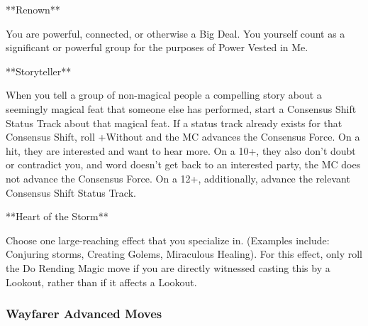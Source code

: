 \documentclass[
  oneside,
  statementpaper,
  9pt]{memoir}
\begin{document}
\begin{Player}

**Renown**

You are powerful, connected, or otherwise a Big Deal. You yourself count as a significant or powerful group for the purposes of Power Vested in Me.

**Storyteller**

When you tell a group of non-magical people a compelling story about a seemingly magical feat that someone else has performed, start a Consensus Shift Status Track about that magical feat. If a status track already exists for that Consensus Shift, roll +Without and the MC advances the Consensus Force. On a hit, they are interested and want to hear more. On a 10+, they also don’t doubt or contradict you, and word doesn’t get back to an interested party, the MC does not advance the Consensus Force. On a 12+, additionally, advance the relevant Consensus Shift Status Track.

**Heart of the Storm**

Choose one large-reaching effect that you specialize in. (Examples include: Conjuring storms, Creating Golems, Miraculous Healing). For this effect, only roll the Do Rending Magic move if you are directly witnessed casting this by a Lookout, rather than if it affects a Lookout.

\end{Player}

\hypertarget{wayfarer-advanced-moves}{%
\subsubsection{Wayfarer Advanced Moves}\label{wayfarer-advanced-moves}}
\end{document}
